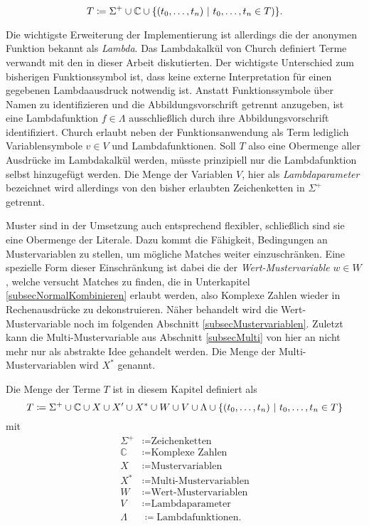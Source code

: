 $$T \coloneqq \Sigma^+ \cup \mathbb C \cup \curl*{(\elems t 0 n)~|~ \elems t 0 n \in T)}.$$

Die wichtigste Erweiterung der Implementierung ist allerdings die der anonymen Funktion bekannt als \emph{\Gls{Lambda}}. Das Lambdakalkül von Church \cite{ChurchLambda36} definiert Terme verwandt mit den in dieser Arbeit diskutierten. Der wichtigste Unterschied zum bisherigen Funktionssymbol ist, dass keine externe Interpretation für einen gegebenen Lambdaausdruck notwendig ist. Anstatt Funktionssymbole über Namen zu identifizieren und die Abbildungsvorschrift getrennt anzugeben, ist eine Lambdafunktion $f \in \Lambda$ ausschließlich durch ihre Abbildungsvorschrift identifiziert. Church erlaubt neben der Funktionsanwendung als Term lediglich Variablensymbole  $v \in V$ und Lambdafunktionen. Soll $T$ also eine Obermenge aller Ausdrücke im Lambdakalkül werden, müsste prinzipiell nur die Lambdafunktion selbst hinzugefügt werden. Die Menge der Variablen $V$, hier als \emph{\Gls{Lambdaparameter}} bezeichnet wird allerdings von den bisher erlaubten Zeichenketten in $\Sigma^+$ getrennt.

Muster sind in der Umsetzung auch entsprechend flexibler, schließlich sind sie eine Obermenge der Literale. Dazu kommt die Fähigkeit, Bedingungen an Mustervariablen zu stellen, um mögliche Matches weiter einzuschränken. Eine spezielle Form dieser Einschränkung ist dabei die der \emph{\Gls{Wert-Mustervariable}} $w \in W$, welche versucht Matches zu finden, die in Unterkapitel \ref{subsecNormalKombinieren} erlaubt werden, also Komplexe Zahlen wieder in Rechenausdrücke zu dekonstruieren. Näher behandelt wird die Wert-Mustervariable noch im folgenden Abschnitt \ref{subsecMustervariablen}. 
Zuletzt kann die Multi-Mustervariable aus Abschnitt \ref{subsecMulti} von hier an nicht mehr nur als abstrakte Idee gehandelt werden. Die Menge der Multi-Mustervariablen wird $X^*$ genannt. 

\begin{definition} \label{defKnotentypenMathe}
Die Menge der Terme $T$ ist in diesem Kapitel definiert als
$$T \coloneqq \Sigma^+ \cup \mathbb C \cup X \cup X' \cup X^* \cup W \cup V \cup \Lambda \cup \curl*{(\elems t 0 n)~|~ \elems t 0 n \in T}$$
mit
\begin{align*}
    \Sigma^+  &\coloneqq \text{Zeichenketten}\\
    \mathbb C &\coloneqq \text{Komplexe Zahlen}\\
    X         &\coloneqq \text{Mustervariablen}\\
    X^*       &\coloneqq \text{Multi-Mustervariablen}\\
    W         &\coloneqq \text{Wert-Mustervariablen}\\
    V         &\coloneqq \text{Lambdaparameter}\\
    \Lambda   &\coloneqq \text{Lambdafunktionen}.
\end{align*}
\end{definition}






